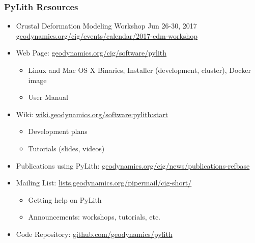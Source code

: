 \documentclass[aspectratio=169,hyperref=colorlinks]{beamer}
\begin{document}
\begin{frame}
  \frametitle{PyLith Resources}
  \summary{}

  \begin{itemize}
  \item Crustal Deformation Modeling Workshop Jun 26-30, 2017
    \href{https://geodynamics.org/cig/events/calendar/2017-cdm-workshop/}{geodynamics.org/cig/events/calendar/2017-cdm-workshop}
  \item Web Page: \href{https://geodynamics.org/cig/software/pylith/}{geodynamics.org/cig/software/pylith}
    \begin{itemize}
    \item Linux and Mac OS X Binaries, Installer (development, cluster), Docker image
    \item User Manual
    \end{itemize}
  \item Wiki: \href{https://wiki.geodynamics.org/software:pylith:start}{wiki.geodynamics.org/software:pylith:start}
    \begin{itemize}
    \item Development plans
    \item Tutorials (slides, videos)
    \end{itemize}
  \item Publications using PyLith: \href{https://geodynamics.org/cig/news/publications-refbase}{geodynamics.org/cig/news/publications-refbase}
  \item Mailing List: \href{http://lists.geodynamics.org/pipermail/cig-short/}{lists.geodynamics.org/pipermail/cig-short/}
    \begin{itemize}
    \item Getting help on PyLith
    \item Announcements: workshops, tutorials, etc.
    \end{itemize}
  \item Code Repository: \href{https://github.com/geodynamics/pylith}{github.com/geodynamics/pylith}
  \end{itemize}

\end{frame}


\end{document}
